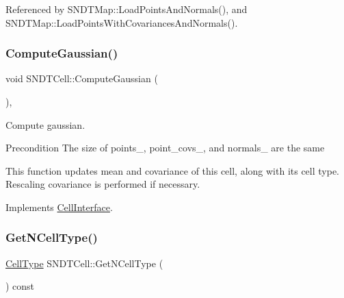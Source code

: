 Referenced by S\+N\+D\+T\+Map\+::\+Load\+Points\+And\+Normals(), and S\+N\+D\+T\+Map\+::\+Load\+Points\+With\+Covariances\+And\+Normals().

\mbox{\label{classSNDTCell_a86aa415947d71974d4a57920bb02fe1b}} 
\subsubsection{\texorpdfstring{Compute\+Gaussian()}{ComputeGaussian()}}
{\footnotesize\ttfamily void S\+N\+D\+T\+Cell\+::\+Compute\+Gaussian (\begin{DoxyParamCaption}{ }\end{DoxyParamCaption})\hspace{0.3cm}{\ttfamily [override]}, {\ttfamily [virtual]}}



Compute gaussian. 

\begin{DoxyPrecond}{Precondition}
The size of {\ttfamily points\+\_\+}, {\ttfamily point\+\_\+covs\+\_\+}, and {\ttfamily normals\+\_\+} are the same
\end{DoxyPrecond}
This function updates mean and covariance of this cell, along with its cell type. Rescaling covariance is performed if necessary. 

Implements \hyperlink{classCellInterface_a77bb8db9ba84ecb98622b18d70854090}{Cell\+Interface}.

\mbox{\label{classSNDTCell_a23d1be04c3e54c8c22c9f965d1afdd59}} 
\subsubsection{\texorpdfstring{Get\+N\+Cell\+Type()}{GetNCellType()}}
{\footnotesize\ttfamily \hyperlink{classSNDTCell_a89f320f167cfeb7ccdbb4a578a169341}{Cell\+Type} S\+N\+D\+T\+Cell\+::\+Get\+N\+Cell\+Type (\begin{DoxyParamCaption}{ }\end{DoxyParamCaption}) const\hspace{0.3cm}{\ttfamily [inline]}}

